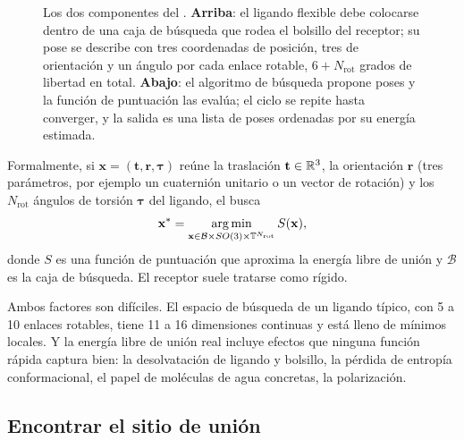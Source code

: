 \begin{figure}[t]
\centering
\resizebox{\linewidth}{!}{}
\caption[Esquema del acoplamiento molecular]{Los dos componentes del . \textbf{Arriba}: el ligando flexible debe colocarse dentro de una caja de búsqueda que rodea el bolsillo del receptor; su pose se describe con tres coordenadas de posición, tres de orientación y un ángulo por cada enlace rotable, $6+N_{\mathrm{rot}}$ grados de libertad en total. \textbf{Abajo}: el algoritmo de búsqueda propone poses y la función de puntuación las evalúa; el ciclo se repite hasta converger, y la salida es una lista de poses ordenadas por su energía estimada.}
\label{fig:15-dockesq}
\end{figure}

Formalmente, si $\mathbf x=(\mathbf t,\mathbf r,\boldsymbol\tau)$ reúne la traslación $\mathbf t\in\mathbb{R}^3$, la orientación $\mathbf r$ (tres parámetros, por ejemplo un cuaternión unitario o un vector de rotación) y los $N_{\mathrm{rot}}$ ángulos de torsión $\boldsymbol\tau$ del ligando, el  busca
\begin{equation}\label{eq:15-docking}
\mathbf x^\ast=\operatorname*{arg\,min}_{\mathbf x\in\mathcal B\times SO(3)\times\mathbb T^{N_{\mathrm{rot}}}} S(\mathbf x),
\end{equation}
donde $S$ es una función de puntuación que aproxima la energía libre de unión y $\mathcal B$ es la caja de búsqueda. El receptor suele tratarse como rígido.

\begin{simbolos}
\end{simbolos}

Ambos factores son difíciles. El espacio de búsqueda de un ligando típico, con 5 a 10 enlaces rotables, tiene 11 a 16 dimensiones continuas y está lleno de mínimos locales. Y la energía libre de unión real incluye efectos que ninguna función rápida captura bien: la desolvatación de ligando y bolsillo, la pérdida de entropía conformacional, el papel de moléculas de agua concretas, la polarización.

\subsection{Encontrar el sitio de unión}

